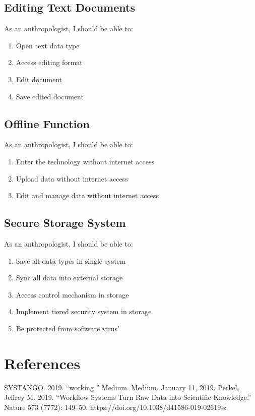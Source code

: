 \documentclass{article}
\begin{document}
\subsection*{Editing Text Documents}
As an anthropologist, I should be able to:
\begin{enumerate}
\item Open text data type
\item Access editing format
\item Edit document
\item Save edited document
\end{enumerate}

\subsection*{Offline Function}
As an anthropologist, I should be able to:
\begin{enumerate}
\item Enter the technology without internet access
\item Upload data without internet access
\item Edit and manage data without internet access
\end{enumerate}

\subsection*{Secure Storage System}
As an anthropologist, I should be able to:
\begin{enumerate}
\item Save all data types in single system
\item Sync all data into external storage
\item Access control mechanism in storage
\item Implement tiered security system in storage
\item Be protected from software virus'
\end{enumerate}


\section{References}
SYSTANGO. 2019. “working ” Medium. Medium. January 11, 2019. \.Perkel, Jeffrey M. 2019. “Workflow Systems Turn Raw Data into Scientific Knowledge.” Nature 573 (7772): 149–50. https://doi.org/10.1038/d41586-019-02619-z
\end{document}
